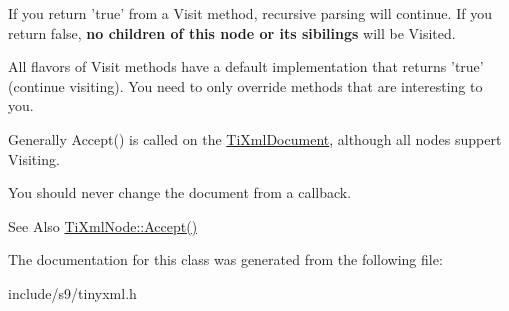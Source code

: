 If you return 'true' from a Visit method, recursive parsing will continue. If you return false, {\bfseries no children of this node or its sibilings} will be Visited.

All flavors of Visit methods have a default implementation that returns 'true' (continue visiting). You need to only override methods that are interesting to you.

Generally Accept() is called on the \hyperlink{classTiXmlDocument}{Ti\-Xml\-Document}, although all nodes suppert Visiting.

You should never change the document from a callback.

\begin{DoxySeeAlso}{See Also}
\hyperlink{classTiXmlNode_acc0f88b7462c6cb73809d410a4f5bb86}{Ti\-Xml\-Node\-::\-Accept()} 
\end{DoxySeeAlso}


The documentation for this class was generated from the following file\-:\begin{DoxyCompactItemize}
\item 
include/s9/tinyxml.\-h\end{DoxyCompactItemize}
